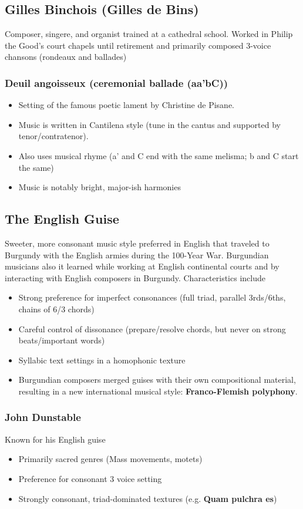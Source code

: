 \documentclass{article}
\begin{document}
  \subsection{Gilles Binchois (Gilles de Bins)}
  Composer, singere, and organist trained at a cathedral school. Worked in Philip the Good's court chapels until retirement and primarily composed 3-voice chansons (rondeaux and ballades)
  \subsubsection{Deuil angoisseux (ceremonial ballade (aa'bC))}
  \begin{itemize}
    \item Setting of the famous poetic lament by Christine de Pisane.
    \item  Music is written in Cantilena style (tune in the cantus and supported by tenor/contratenor).
    \item Also uses musical rhyme (a' and C end with the same melisma; b and C start the same)
    \item Music is notably bright, major-ish harmonies
  \end{itemize}
  \subsection{The English Guise}
  Sweeter, more consonant music style preferred in English that traveled to Burgundy with the English armies during the 100-Year War. Burgundian musicians also it learned while working at English continental courts and by interacting with English composers in Burgundy. Characteristics include
  \begin{itemize}
    \item Strong preference for imperfect consonances (full triad, parallel 3rds/6ths, chains of 6/3 chords)
    \item Careful control of dissonance (prepare/resolve chords, but never on strong beats/important words)
    \item Syllabic text settings in a homophonic texture
    \item Burgundian composers merged guises with their own compositional material, resulting in a new international musical style: \textbf{Franco-Flemish polyphony}.
  \end{itemize}
  \subsubsection{John Dunstable}
  Known for his English guise
  \begin{itemize}
    \item Primarily sacred genres (Mass movements, motets)
    \item Preference for consonant 3 voice setting
    \item Strongly consonant, triad-dominated textures (e.g. \textbf{Quam pulchra es})
  \end{itemize}
\end{document}
